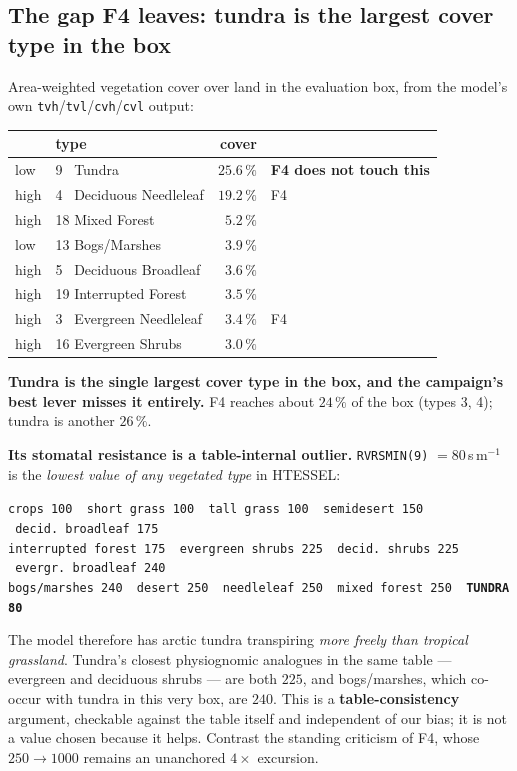\documentclass[10pt]{article}
\begin{document}
\subsection{The gap F4 leaves: tundra is the largest cover type in the box}\label{sub:tundra}
Area-weighted vegetation cover over land in the evaluation box, from the model's own
\texttt{tvh}/\texttt{tvl}/\texttt{cvh}/\texttt{cvl} output:

\begin{center}\footnotesize
\begin{tabular}{l l r l}
\toprule
 & type & cover & \\
\midrule
low & 9 \ Tundra & $\mathbf{25.6\,\%}$ & \textbf{F4 does not touch this} \\
high & 4 \ Deciduous Needleleaf & $19.2\,\%$ & F4 \\
high & 18 Mixed Forest & $5.2\,\%$ & \\
low & 13 Bogs/Marshes & $3.9\,\%$ & \\
high & 5 \ Deciduous Broadleaf & $3.6\,\%$ & \\
high & 19 Interrupted Forest & $3.5\,\%$ & \\
high & 3 \ Evergreen Needleleaf & $3.4\,\%$ & F4 \\
high & 16 Evergreen Shrubs & $3.0\,\%$ & \\
\bottomrule
\end{tabular}
\end{center}

\noindent \textbf{Tundra is the single largest cover type in the box, and the campaign's best
lever misses it entirely.} F4 reaches about $24\,\%$ of the box (types 3, 4); tundra is
another $26\,\%$.

\noindent\textbf{Its stomatal resistance is a table-internal outlier.} \texttt{RVRSMIN(9)}
$= 80$\,s\,m$^{-1}$ is the \emph{lowest value of any vegetated type} in HTESSEL:

\begin{center}\footnotesize
\texttt{crops 100 \ short grass 100 \ tall grass 100 \ semidesert 150 \ decid.\ broadleaf 175}\\
\texttt{interrupted forest 175 \ evergreen shrubs 225 \ decid.\ shrubs 225 \ evergr.\ broadleaf 240}\\
\texttt{bogs/marshes 240 \ desert 250 \ needleleaf 250 \ mixed forest 250 \ \textbf{TUNDRA 80}}
\end{center}

\noindent The model therefore has arctic tundra transpiring \emph{more freely than tropical
grassland}. Tundra's closest physiognomic analogues in the same table --- evergreen and
deciduous shrubs --- are both $225$, and bogs/marshes, which co-occur with tundra in this very
box, are $240$. This is a \textbf{table-consistency} argument, checkable against the table
itself and independent of our bias; it is not a value chosen because it helps. Contrast the
standing criticism of F4, whose $250\to1000$ remains an unanchored $4\times$ excursion.
\end{document}
